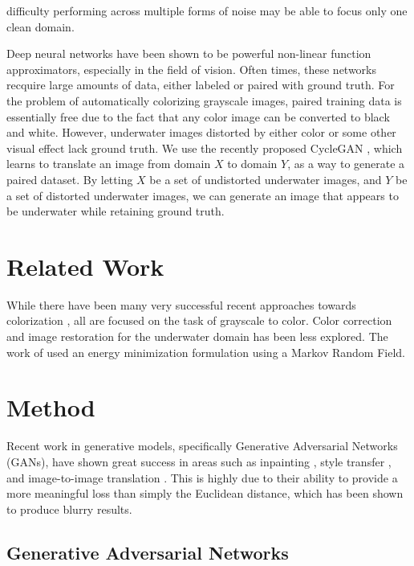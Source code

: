 \documentclass[conference]{IEEEtran}
\begin{document}
\noindent difficulty performing across multiple forms of noise may be able to focus only one clean domain.

Deep neural networks have been shown to be powerful non-linear function approximators, especially in the field of
vision. Often times, these networks recquire large amounts of data, either labeled or paired with ground truth.
For the problem of automatically colorizing grayscale images, paired training data is essentially free due to the
fact that any color image can be converted to black and white. However, underwater images distorted by either color
or some other visual effect lack ground truth. We use the recently proposed CycleGAN \cite{zhu2017unpaired}, which
learns to translate an image from domain $X$ to domain $Y$, as a way to generate a paired dataset. By letting $X$ be
a set of undistorted underwater images, and $Y$ be a set of distorted underwater images, we can generate an image
that appears to be underwater while retaining ground truth.

\section{Related Work}

While there have been many very successful recent approaches towards colorization
\cite{zhang2016colorful,iizuka2016let}, all are focused on the task of grayscale to color. Color correction and image
restoration for the underwater domain has been less explored. The work of \cite{torres2005color} used an energy
minimization formulation using a Markov Random Field. 


\section{Method}
Recent work in generative models, specifically Generative Adversarial
Networks (GANs), have shown great success in areas such as inpainting \cite{pathak2016context}, style transfer
\cite{Gatys_2016_CVPR}, and image-to-image translation \cite{isola2016image,zhu2017unpaired}. This is highly due to
their ability to provide a more meaningful loss than simply the Euclidean distance, which has been shown to produce
blurry results. 


\subsection{Generative Adversarial Networks}
\end{document}
